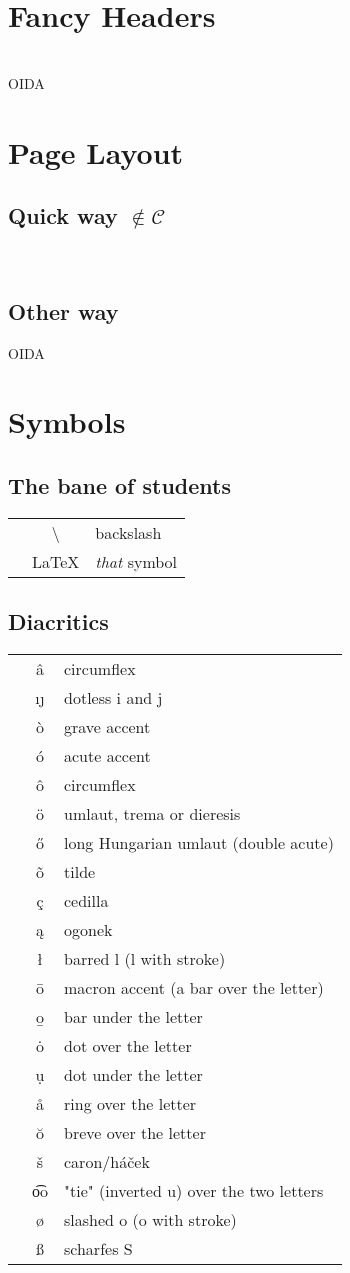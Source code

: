 \documentclass[11pt,a4paper]{article}
\newcommand{\package}[1]{\code{\usepackage{#1}}\label{#1}}
\newcommand{\noncurs}{\hspace{.5cm}$\notin \mathscr{C}$}
\newcommand{\explain}[2]{\code{#1} & #1 & #2\\}
\begin{document}
{\section{Fancy Headers}

\code{\pagestyle{fancy} %
}\\
OIDA

\section{Page Layout}
\subsection[Quick way]{Quick way \noncurs}
\package{geometry}\\
\code{\geometry{a4paper,left=30mm,right=20mm,top=20mm,bottom=30mm}}

\subsection{Other way}
OIDA



\section{Symbols}
\subsection{The bane of students}
\begin{tabular}{l c l}
\code{$\backslash$ \textbackslash} & \textbackslash & backslash \\
\explain{\LaTeX}{\textit{that} symbol}
\end{tabular}

\subsection{Diacritics}
\begin{tabular}{l c l}
\explain{\^{a}}{circumflex}
\explain{\i \j}{dotless i and j}
\explain{\`{o}}{grave accent}
\explain{\'{o}}{acute accent}
\explain{\^{o}}{circumflex}
\explain{\"{o}}{umlaut, trema or dieresis}
\explain{\H{o}}{long Hungarian umlaut (double acute)}
\explain{\~{o}}{tilde}
\explain{\c{c}}{cedilla}
\explain{\k{a}}{ogonek}
\explain{\l{}}{barred l (l with stroke)}
\explain{\={o}}{macron accent (a bar over the letter)}
\explain{\b{o}}{bar under the letter}
\explain{\.{o}}{dot over the letter}
\explain{\d{u}}{dot under the letter}
\explain{\r{a}}{ring over the letter}
\explain{\u{o}}{breve over the letter}
\explain{\v{s}}{caron/háček}
\explain{\t{oo}}{"tie" (inverted u) over the two letters}
\explain{\o}{slashed o (o with stroke)}
\explain{\ss}{scharfes S}
\end{tabular}

}
\end{document}
